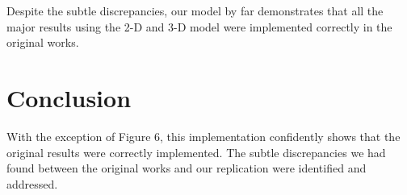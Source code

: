 Despite the subtle discrepancies, our model by far demonstrates that all the major results using the 2-D and 3-D model were implemented correctly in the original works. 

\section{Conclusion}

With the exception of Figure 6, this implementation confidently shows that the original results were correctly implemented. The subtle discrepancies we had found between the original works and our replication were identified and addressed.  
